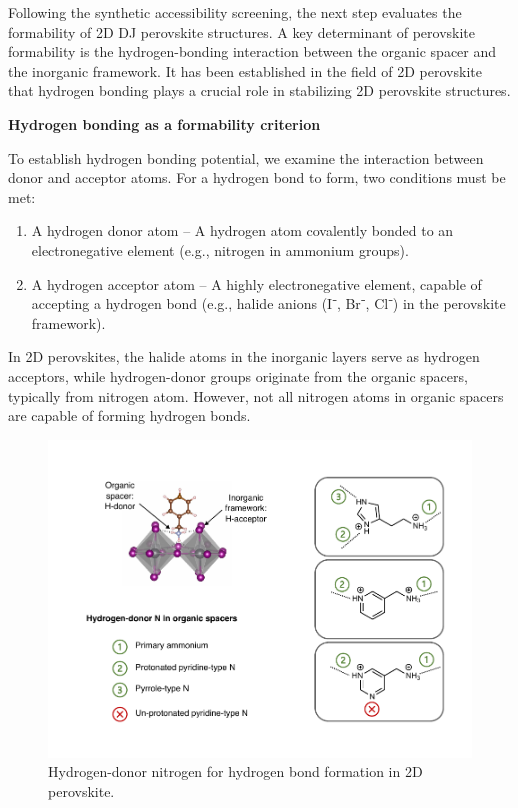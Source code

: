 Following the synthetic accessibility screening, the next step evaluates the formability of 2D DJ perovskite structures. A key determinant of perovskite formability is the hydrogen-bonding interaction between the organic spacer and the inorganic framework. It has been established in the field of 2D perovskite that hydrogen bonding plays a crucial role in stabilizing 2D perovskite structures.

\textbf{Hydrogen bonding as a formability criterion}

To establish hydrogen bonding potential, we examine the interaction between donor and acceptor atoms. For a hydrogen bond to form, two conditions must be met:
\begin{enumerate}
    \item A hydrogen donor atom – A hydrogen atom covalently bonded to an electronegative element (e.g., nitrogen in ammonium groups).
    \item A hydrogen acceptor atom – A highly electronegative element, capable of accepting a hydrogen bond (e.g., halide anions (I⁻, Br⁻, Cl⁻) in the perovskite framework).
\end{enumerate}

In 2D perovskites, the halide atoms in the inorganic layers serve as hydrogen acceptors, while hydrogen-donor groups originate from the organic spacers, typically from nitrogen atom. However, not all nitrogen atoms in organic spacers are capable of forming hydrogen bonds.


\begin{figure}[htbp]
    \centering
    \includegraphics[width=\textwidth]{figures/synthesis-feasibility/figure5-4.pdf}
    \caption{Hydrogen-donor nitrogen for hydrogen bond formation in 2D perovskite.}
    \label{fig:figure5.4}
\end{figure}


